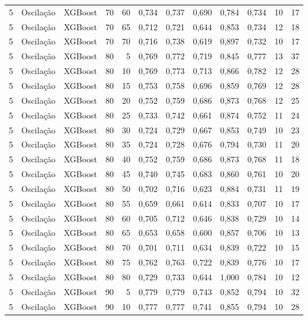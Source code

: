 \begin{longtable}{@{}rllrrrrrrrrr@{}}
5 & Oscilação & XGBoost & 70 & 60 & 0,734 & 0,737 & 0,690 & 0,784 & 0,734 & 10 & 17 \\
5 & Oscilação & XGBoost & 70 & 65 & 0,712 & 0,721 & 0,644 & 0,853 & 0,734 & 12 & 18 \\
5 & Oscilação & XGBoost & 70 & 70 & 0,716 & 0,738 & 0,619 & 0,897 & 0,732 & 10 & 17 \\
5 & Oscilação & XGBoost & 80 & 5 & 0,769 & 0,772 & 0,719 & 0,845 & 0,777 & 13 & 37 \\
5 & Oscilação & XGBoost & 80 & 10 & 0,769 & 0,773 & 0,713 & 0,866 & 0,782 & 12 & 28 \\
5 & Oscilação & XGBoost & 80 & 15 & 0,753 & 0,758 & 0,696 & 0,859 & 0,769 & 12 & 28 \\
5 & Oscilação & XGBoost & 80 & 20 & 0,752 & 0,759 & 0,686 & 0,873 & 0,768 & 12 & 25 \\
5 & Oscilação & XGBoost & 80 & 25 & 0,733 & 0,742 & 0,661 & 0,874 & 0,752 & 11 & 24 \\
5 & Oscilação & XGBoost & 80 & 30 & 0,724 & 0,729 & 0,667 & 0,853 & 0,749 & 10 & 23 \\
5 & Oscilação & XGBoost & 80 & 35 & 0,724 & 0,728 & 0,676 & 0,794 & 0,730 & 11 & 20 \\
5 & Oscilação & XGBoost & 80 & 40 & 0,752 & 0,759 & 0,686 & 0,873 & 0,768 & 11 & 18 \\
5 & Oscilação & XGBoost & 80 & 45 & 0,740 & 0,745 & 0,683 & 0,860 & 0,761 & 10 & 20 \\
5 & Oscilação & XGBoost & 80 & 50 & 0,702 & 0,716 & 0,623 & 0,884 & 0,731 & 11 & 19 \\
5 & Oscilação & XGBoost & 80 & 55 & 0,659 & 0,661 & 0,614 & 0,833 & 0,707 & 10 & 17 \\
5 & Oscilação & XGBoost & 80 & 60 & 0,705 & 0,712 & 0,646 & 0,838 & 0,729 & 10 & 14 \\
5 & Oscilação & XGBoost & 80 & 65 & 0,653 & 0,658 & 0,600 & 0,857 & 0,706 & 10 & 13 \\
5 & Oscilação & XGBoost & 80 & 70 & 0,701 & 0,711 & 0,634 & 0,839 & 0,722 & 10 & 15 \\
5 & Oscilação & XGBoost & 80 & 75 & 0,762 & 0,763 & 0,722 & 0,839 & 0,776 & 10 & 17 \\
5 & Oscilação & XGBoost & 80 & 80 & 0,729 & 0,733 & 0,644 & 1,000 & 0,784 & 10 & 12 \\
5 & Oscilação & XGBoost & 90 & 5 & 0,779 & 0,779 & 0,743 & 0,852 & 0,794 & 10 & 32 \\
5 & Oscilação & XGBoost & 90 & 10 & 0,777 & 0,777 & 0,741 & 0,855 & 0,794 & 10 & 28 \\

\end{longtable}
